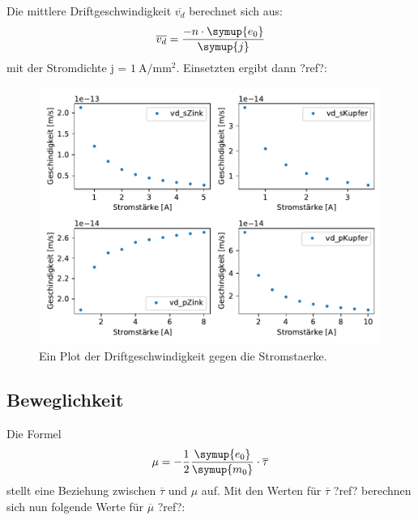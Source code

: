     Die mittlere Driftgeschwindigkeit $\overline{v_d}$ berechnet sich aus:
    \begin{equation}
        \overline{v_d} = \frac{-n \cdot \symup{e_0}}{\symup{j}}
    \end{equation}
    mit der Stromdichte j = $\SI{1}{\ampere\per\milli\meter\squared}$.
    \noindent
    Einsetzten ergibt dann ?ref?:
    \begin{figure}[H]
        \centering
        \includegraphics[width=1.1\textwidth]{build/Driftgeschwindigkeit.pdf}
        \caption{Ein Plot der Driftgeschwindigkeit gegen die Stromstaerke.}
        \label{img:vd}
    \end{figure}


    \subsection{Beweglichkeit}


    Die Formel
    \begin{equation}
        \mu= -\frac{1}{2}\frac{\symup{e_0}}{\symup{m_0}}\cdot   \overline{\tau}
    \end{equation}
    stellt eine Beziehung zwischen $\overline{\tau}$ und $\mu$ auf. Mit den Werten für $\overline{\tau}$ ?ref? berechnen sich nun folgende Werte 
    für $\overline{\mu}$ ?ref?:

